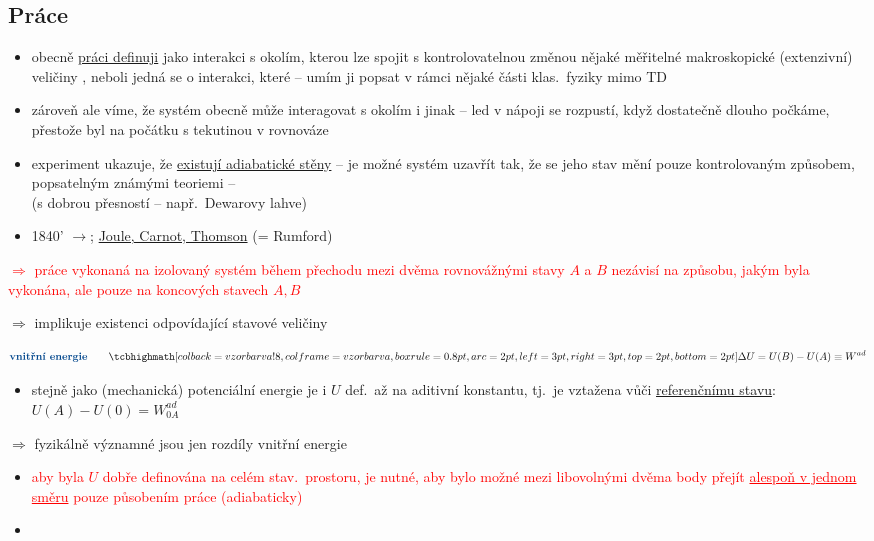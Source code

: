 \subsection{Práce}
\begin{itemize}
  \item obecně \underline{práci definuji} jako interakci s okolím, kterou lze spojit s kontrolovatelnou změnou nějaké měřitelné makroskopické (extenzivní) veličiny , neboli jedná se o interakci, které  -- umím ji popsat v rámci nějaké části klas.\ fyziky mimo TD
  \item[--] zároveň ale víme, že systém obecně může interagovat s okolím i jinak -- led v nápoji se rozpustí, když dostatečně dlouho počkáme, přestože byl na počátku s tekutinou v rovnováze
  \item experiment ukazuje, že \underline{existují adiabatické stěny} -- je možné systém uzavřít tak, že se jeho stav mění pouze kontrolovaným způsobem, popsatelným známými teoriemi --  \\
        (s dobrou přesností -- např.\ Dewarovy lahve)
  \item 1840' $\to$; \underline{Joule, Carnot, Thomson} (= Rumford)
\end{itemize}

\begin{veta}
\textcolor{Red}{$\Rightarrow$ práce vykonaná na izolovaný systém během přechodu mezi dvěma rovnovážnými stavy $A$ a $B$ nezávisí na způsobu, jakým byla vykonána, ale pouze na koncových stavech $A, B$}
\end{veta}

$\Rightarrow$ implikuje existenci odpovídající stavové veličiny
\begin{definice}
\[
  \text{\kw{vnitřní energie}}\qquad \vzorec{\Delta U = U(B) - U(A) \equiv W^{ad}}
\]
\end{definice}

\begin{itemize}
  \item stejně jako (mechanická) potenciální energie je i $U$ def.\ až na aditivní konstantu, tj.\ je vztažena vůči \underline{referenčnímu stavu}: \quad $U(A) - U(0) = W^{ad}_{0A}$
\end{itemize}
$\Rightarrow$ fyzikálně významné jsou jen rozdíly vnitřní energie
\begin{itemize}
  \item \textcolor{Red}{aby byla $U$ dobře definována na celém stav.\ prostoru, je nutné, aby bylo možné mezi libovolnými dvěma body přejít \underline{alespoň v jednom směru} pouze působením práce (adiabaticky)}
  \item {}
\end{itemize}

